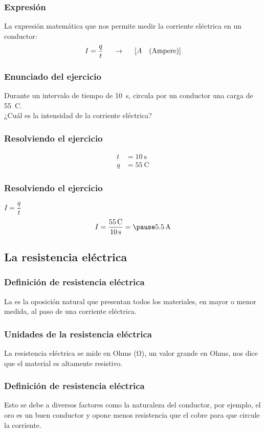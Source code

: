 \documentclass[14pt]{beamer}
\begin{document}
\begin{frame}
\frametitle{Expresión}
La expresión matemática que nos permite medir la corriente eléctrica en un conductor:
\pause
\begin{align*}
I = \dfrac{q}{t} \hspace{0.5cm} \rightarrow \hspace{0.5cm} \left[ A \quad (\text{Ampere}) \right]
\end{align*}
\end{frame}
\begin{frame}
\frametitle{Enunciado del ejercicio}
Durante un intervalo de tiempo de \SI{10}{\second}, circula por un conductor una carga de \SI{55}{\coulomb}.
\\
\bigskip
\pause
¿Cuál es la intensidad de la corriente eléctrica?
\end{frame}
\begin{frame}
\frametitle{Resolviendo el ejercicio}
\pause
\begin{align*}
t &= \SI{10}{\second} \\[0.5em]
q &= \SI{55}{\coulomb}
\end{align*}
\end{frame}
\begin{frame}
\frametitle{Resolviendo el ejercicio}
 \pause $I = \dfrac{q}{t}$
\pause
\begin{eqnarray*}
\begin{aligned}
I = \dfrac{\SI{55}{\coulomb}}{\SI{10}{\second}} = \pause \SI{5.5}{\ampere}
\end{aligned}
\end{eqnarray*}
\end{frame}

\subsection{La resistencia eléctrica}

\begin{frame}
\frametitle{Definición de resistencia eléctrica}
La  es la oposición natural que presentan todos los materiales, en mayor o menor medida, al paso de una corriente eléctrica.
\end{frame}
\begin{frame}
\frametitle{Unidades de la resistencia eléctrica}
La resistencia eléctrica se mide en Ohms (\unit{\ohm}), \pause un valor grande en Ohms, nos dice que el material es altamente resistivo.
\end{frame}
\begin{frame}
\frametitle{Definición de resistencia eléctrica}    
Esto se debe a diversos factores como la naturaleza del conductor, \pause por ejemplo, el oro es un buen conductor y opone menos resistencia que el cobre para que circule la corriente.
\end{frame}
\end{document}
